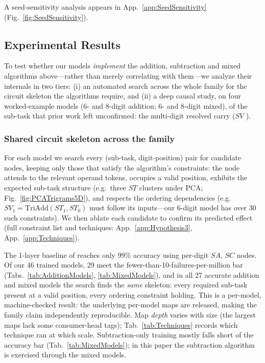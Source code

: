 \documentclass[11pt]{article}
\newcommand{\SAC}{$SA$, }
\newcommand{\SC}{$SC$ }
\newcommand{\SV}{$SV$ }
\begin{document}
A seed-sensitivity analysis appears in App.~\ref{app:SeedSensitivity} (Fig.~\ref{fig:SeedSensitivity}).


\subsection{Experimental Results}
\label{Sub:ExperimentalResults}

To test whether our models \emph{implement} the addition, subtraction and mixed algorithms above---rather than merely correlating with them---we 
analyze their internals in two tiers: (i) an automated search across the whole family for the circuit skeleton the algorithms require, and (ii) 
a deep causal study, on four worked-example models (6- and 8-digit addition; 6- and 8-digit mixed), of the sub-task that prior work left 
unconfirmed: the multi-digit resolved carry (\SV).

\subsubsection{Shared circuit skeleton across the family}
\label{sec:SkeletonFamily}

For each model we search every (sub-task, digit-position) pair for candidate nodes, keeping only those that satisfy the algorithm's constraints:
the node attends to the relevant operand tokens, occupies a valid position, exhibits the expected sub-task structure (e.g.\ three $ST$ clusters
under PCA; Fig.~\ref{fig:PCATrigrams5D}), and respects the ordering dependencies (e.g.\ $SV_1 = \mathrm{TriAdd}(ST_1, ST_0)$ must follow its inputs---our 
6-digit model has over 30 such constraints). We then ablate each candidate to confirm its predicted effect (full constraint list and
techniques: App.~\ref{app:Hypothesis3}, App.~\ref{app:Techniques}).

The 1-layer baseline of \citet{quirke2023understanding} reaches only 99\% accuracy using per-digit \SAC \SC nodes. Of our 46 trained
models, 29 meet the fewer-than-10-failures-per-million bar (Tabs.~\ref{tab:AdditionModels}, \ref{tab:MixedModels}), and in all 27 accurate
addition and mixed models the search finds the \emph{same} skeleton: every required sub-task present at a valid position, every ordering
constraint holding. This is a per-model, machine-checked result: the underlying per-model maps are released, making the family claim
independently reproducible. Map \emph{depth} varies with size (the largest maps lack some consumer-head tags); Tab.~\ref{tab:Techniques}
records which technique ran at which scale.
Subtraction-only training mostly falls short of the accuracy bar (Tab.~\ref{tab:MixedModels}); in this paper the subtraction algorithm is exercised through the mixed models.
\end{document}
